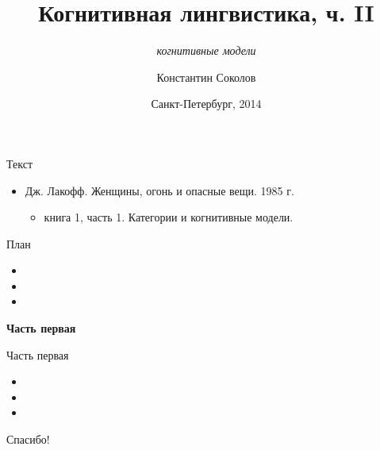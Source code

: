 \documentclass{beamer}
\begin{document}
\title{\Large{Когнитивная лингвистика, ч. II}}
\subtitle{\textit{когнитивные модели}}
\author{Константин Соколов}
\date{Санкт-Петербург, 2014} 
\begin{frame}
    \thispagestyle{empty}
    \titlepage
\end{frame}

\begin{frame}{Текст}
\setcounter{framenumber}{1}
\begin{itemize}
	\item Дж. Лакофф. Женщины, огонь и опасные вещи. 1985 г.
	    \medskip
	    \begin{itemize}
	        \item книга 1, часть 1. Категории и когнитивные модели.
	    \end{itemize}
\end{itemize}
\end{frame}

\begin{frame}{План}
    \begin{itemize}
        \item 
        \medskip
        \item 
        \medskip
        \item 
        \medskip
    \end{itemize}
\end{frame}

\begin{frame}{}
\begin{center}
	\textbf{Часть первая}
\end{center}
\end{frame}

\begin{frame}{Часть первая}
\begin{itemize}
	\item 
	\medskip
	\item 
	\medskip
	\item  
\end{itemize}
\end{frame}




\begin{frame}{}
    \thispagestyle{empty}
    \begin{center}
        {\large Спасибо!}
    \end{center}
\end{frame}
\end{document}
